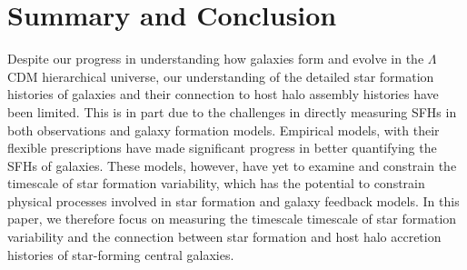 \documentclass[12pt, letterpaper, preprint, tighten]{aastex62}
\newcommand{\logsfr}{\log\mathrm{SFR}}
\begin{document}

\section{Summary and Conclusion} \label{sec:summary}
Despite our progress in understanding how galaxies form and evolve in
the $\Lambda$CDM  hierarchical universe, our understanding of the
detailed star formation histories of galaxies and their connection to host
halo assembly histories have been limited. This is in part due to the
challenges in directly measuring SFHs in both observations and galaxy
formation models. Empirical models, with their flexible prescriptions
have made significant progress in better quantifying the SFHs of galaxies.
These models, however, have yet to examine and constrain the timescale of
star formation variability, which has the potential to constrain physical
processes involved in star formation and galaxy feedback models. In this
paper, we therefore focus on  measuring the timescale timescale of star
formation variability and the connection between star formation and host
halo accretion histories of star-forming central galaxies.
\end{document}

